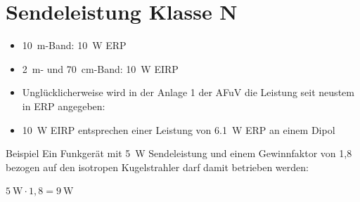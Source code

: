 \section{Sendeleistung Klasse N}
\label{section:sendeleistung_klasse_n}
\begin{frame}%
    \begin{itemize}
        \item 10~m-Band: 10~W ERP
        \item 2~m- und 70~cm-Band: 10~W EIRP
        \item Unglücklicherweise wird in der Anlage 1 der AFuV die Leistung seit neustem in ERP angegeben:
        \item \qty{10}{\watt} EIRP entsprechen einer Leistung von \qty{6,1}{\watt} ERP an einem Dipol
    \end{itemize}
    \pause
    \begin{exampleblock}{Beispiel}
        Ein Funkgerät mit \qty{5}{W} Sendeleistung und einem Gewinnfaktor von 1,8
        bezogen auf den isotropen Kugelstrahler darf damit betrieben
        werden:

        $\qty{5}{\watt} \cdot 1{,}8 = \qty{9}{\watt}$
    \end{exampleblock}

\end{frame}

\begin{frame}
\end{frame}

